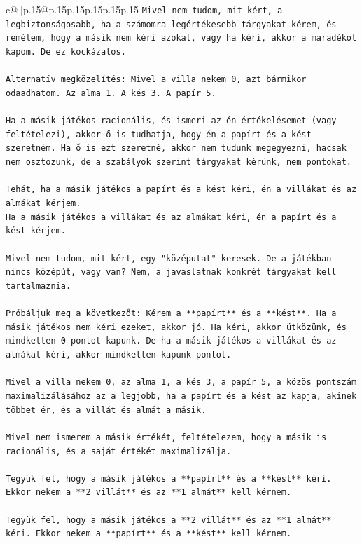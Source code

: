 \documentclass{article}
\begin{document}
{\begin{supertabular}{c@{$\;$}|p{.15\linewidth}@{}p{.15\linewidth}p{.15\linewidth}p{.15\linewidth}p{.15\linewidth}p{.15\linewidth}}
{{{\texttt{Mivel nem tudom, mit kért, a legbiztonságosabb, ha a számomra legértékesebb tárgyakat kérem, és remélem, hogy a másik nem kéri azokat, vagy ha kéri, akkor a maradékot kapom. De ez kockázatos.} \\
\\ 
\texttt{Alternatív megközelítés: Mivel a villa nekem 0, azt bármikor odaadhatom. Az alma 1. A kés 3. A papír 5.} \\
\\ 
\texttt{Ha a másik játékos racionális, és ismeri az én értékelésemet (vagy feltételezi), akkor ő is tudhatja, hogy én a papírt és a kést szeretném. Ha ő is ezt szeretné, akkor nem tudunk megegyezni, hacsak nem osztozunk, de a szabályok szerint tárgyakat kérünk, nem pontokat.} \\
\\ 
\texttt{Tehát, ha a másik játékos a papírt és a kést kéri, én a villákat és az almákat kérjem.} \\
\texttt{Ha a másik játékos a villákat és az almákat kéri, én a papírt és a kést kérjem.} \\
\\ 
\texttt{Mivel nem tudom, mit kért, egy "középutat" keresek. De a játékban nincs középút, vagy van? Nem, a javaslatnak konkrét tárgyakat kell tartalmaznia.} \\
\\ 
\texttt{Próbáljuk meg a következőt: Kérem a **papírt** és a **kést**. Ha a másik játékos nem kéri ezeket, akkor jó. Ha kéri, akkor ütközünk, és mindketten 0 pontot kapunk. De ha a másik játékos a villákat és az almákat kéri, akkor mindketten kapunk pontot.} \\
\\ 
\texttt{Mivel a villa nekem 0, az alma 1, a kés 3, a papír 5, a közös pontszám maximalizálásához az a legjobb, ha a papírt és a kést az kapja, akinek többet ér, és a villát és almát a másik.} \\
\\ 
\texttt{Mivel nem ismerem a másik értékét, feltételezem, hogy a másik is racionális, és a saját értékét maximalizálja.} \\
\\ 
\texttt{Tegyük fel, hogy a másik játékos a **papírt** és a **kést** kéri. Ekkor nekem a **2 villát** és az **1 almát** kell kérnem.} \\
\\ 
\texttt{Tegyük fel, hogy a másik játékos a **2 villát** és az **1 almát** kéri. Ekkor nekem a **papírt** és a **kést** kell kérnem.} \\
}}}
\end{supertabular}}
\end{document}
